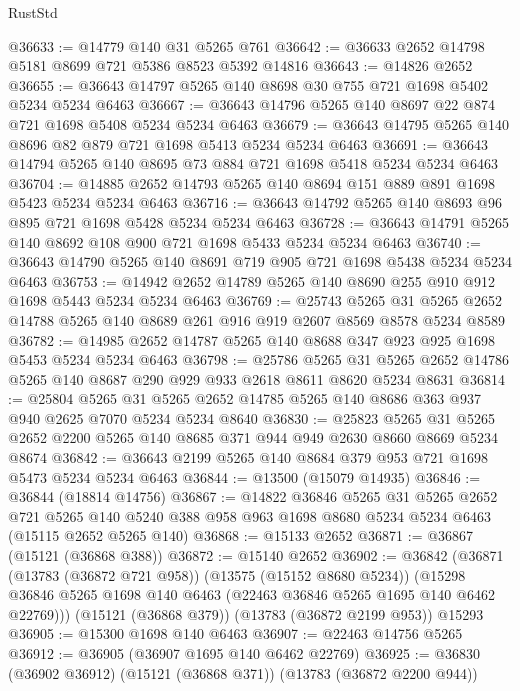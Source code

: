 \begin{lexlean}{RustStd}
\begin{coremodule}
@36633 := @14779 @140 @31 @5265 @761
@36642 := @36633 @2652 @14798 @5181 @8699 @721 @5386 @8523 @5392 @14816
@36643 := @14826 @2652
@36655 := @36643 @14797 @5265 @140 @8698 @30 @755 @721 @1698 @5402 @5234 @5234 @6463
@36667 := @36643 @14796 @5265 @140 @8697 @22 @874 @721 @1698 @5408 @5234 @5234 @6463
@36679 := @36643 @14795 @5265 @140 @8696 @82 @879 @721 @1698 @5413 @5234 @5234 @6463
@36691 := @36643 @14794 @5265 @140 @8695 @73 @884 @721 @1698 @5418 @5234 @5234 @6463
@36704 := @14885 @2652 @14793 @5265 @140 @8694 @151 @889 @891 @1698 @5423 @5234 @5234 @6463
@36716 := @36643 @14792 @5265 @140 @8693 @96 @895 @721 @1698 @5428 @5234 @5234 @6463
@36728 := @36643 @14791 @5265 @140 @8692 @108 @900 @721 @1698 @5433 @5234 @5234 @6463
@36740 := @36643 @14790 @5265 @140 @8691 @719 @905 @721 @1698 @5438 @5234 @5234 @6463
@36753 := @14942 @2652 @14789 @5265 @140 @8690 @255 @910 @912 @1698 @5443 @5234 @5234 @6463
@36769 := @25743
    @5265
    @31
    @5265
    @2652
    @14788
    @5265
    @140
    @8689
    @261
    @916
    @919
    @2607
    @8569
    @8578
    @5234
    @8589
@36782 := @14985 @2652 @14787 @5265 @140 @8688 @347 @923 @925 @1698 @5453 @5234 @5234 @6463
@36798 := @25786
    @5265
    @31
    @5265
    @2652
    @14786
    @5265
    @140
    @8687
    @290
    @929
    @933
    @2618
    @8611
    @8620
    @5234
    @8631
@36814 := @25804
    @5265
    @31
    @5265
    @2652
    @14785
    @5265
    @140
    @8686
    @363
    @937
    @940
    @2625
    @7070
    @5234
    @5234
    @8640
@36830 := @25823
    @5265
    @31
    @5265
    @2652
    @2200
    @5265
    @140
    @8685
    @371
    @944
    @949
    @2630
    @8660
    @8669
    @5234
    @8674
@36842 := @36643 @2199 @5265 @140 @8684 @379 @953 @721 @1698 @5473 @5234 @5234 @6463
@36844 := @13500 (@15079 @14935)
@36846 := @36844 (@18814 @14756)
@36867 := @14822
    @36846
    @5265
    @31
    @5265
    @2652
    @721
    @5265
    @140
    @5240
    @388
    @958
    @963
    @1698
    @8680
    @5234
    @5234
    @6463
    (@15115 @2652 @5265 @140)
@36868 := @15133 @2652
@36871 := @36867 (@15121 (@36868 @388))
@36872 := @15140 @2652
@36902 := @36842
    (@36871
      (@13783 (@36872 @721 @958))
      (@13575 (@15152 @8680 @5234))
      (@15298 @36846 @5265 @1698 @140 @6463 (@22463 @36846 @5265 @1695 @140 @6462 @22769)))
    (@15121 (@36868 @379))
    (@13783 (@36872 @2199 @953))
    @15293
@36905 := @15300 @1698 @140 @6463
@36907 := @22463 @14756 @5265
@36912 := @36905 (@36907 @1695 @140 @6462 @22769)
@36925 := @36830
    (@36902 @36912)
    (@15121 (@36868 @371))
    (@13783 (@36872 @2200 @944))

\end{coremodule}
\end{lexlean}
